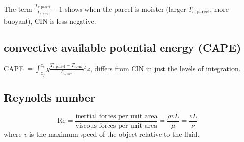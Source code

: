 The term $\frac{T_{v,\text{parcel}}}{T_{v,\text{env}}} - 1$ shows when the parcel is moister (larger
$T_{v,\text{parcel}}$, more buoyant), CIN is less negative.

\subsection{convective available potential energy (CAPE)}
\begin{defn*} 
CAPE $=\int_{z_f}^{z_e} g \frac{T_{v,\text{parcel}} - T_{v,\text{env}}}{T_{v,\text{env}}} $d$z$,
differs from CIN in just the levels of integration.
\end{defn*}


\subsection{Reynolds number}
\begin{defn*}
%
\begin{equation}
   \text{Re} = \frac{\text{inertial forces per unit area}}{\text{viscous forces per unit area}} =
   \frac{\rho v L}{\mu} = \frac{v L}{\nu} 
\end{equation}
%
where $v$ is the maximum speed of the object relative to the fluid.
\end{defn*}
